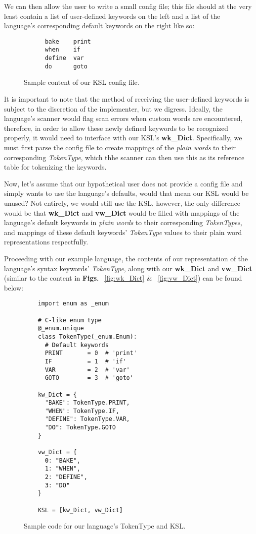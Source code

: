 \documentclass{article}
\begin{document}
We can then allow the user to write a small config file; this file should at the very least contain a list of user-defined keywords on the left and a list of the language's corresponding default keywords on the right like so:

\begin{figure}[ht]
  \begin{verbatim}
      bake    print
      when    if
      define  var
      do      goto
  \end{verbatim}
  \caption{Sample content of our KSL config file.}
  \label{fig:ksl-config-file}
\end{figure}

It is important to note that the method of receiving the user-defined keywords is subject to the discretion of the implementer, but we digress. Ideally, the language's scanner would flag scan errors when custom words are encountered, therefore, in order to allow these newly defined keywords to be recognized properly, it would need to interface with our KSL's \textbf{wk\_Dict}. Specifically, we must first parse the config file to create mappings of the \textit{plain words} 
to their corresponding \textit{TokenType}, which thhe scanner can then use this as its reference table for tokenizing the keywords.

Now, let's assume that our hypothetical user does not provide a config file and simply wants to use the language's defaults, would that mean our KSL would be unused? Not entirely, we would still use the KSL, however, the only difference would be that \textbf{wk\_Dict} and \textbf{vw\_Dict} would be filled with mappings of the language's default keywords in \textit{plain words} to their corresponding \textit{TokenTypes}, and mappings of these default keywords' \textit{TokenType} values to their plain word representations respectfully.

Proceeding with our example language, the contents of our representation of the language's syntax keywords' \textit{TokenType}, along with our \textbf{wk\_Dict} and \textbf{vw\_Dict} (similar to the content in \textbf{Figs}. ~\ref{fig:wk_Dict} \& ~\ref{fig:vw_Dict}) can be found below:

\begin{figure}[ht]
  \begin{verbatim}
    import enum as _enum 

    # C-like enum type
    @_enum.unique
    class TokenType(_enum.Enum):
      # Default keywords
      PRINT       = 0  # 'print'
      IF          = 1  # 'if'
      VAR         = 2  # 'var'
      GOTO        = 3  # 'goto'
    
    kw_Dict = {
      "BAKE": TokenType.PRINT,
      "WHEN": TokenType.IF,
      "DEFINE": TokenType.VAR,
      "DO": TokenType.GOTO
    }

    vw_Dict = {
      0: "BAKE",
      1: "WHEN",
      2: "DEFINE",
      3: "DO"
    }

    KSL = [kw_Dict, vw_Dict]
  \end{verbatim}
  \caption{Sample code for our language's TokenType and KSL.}
  \label{fig:sample-code0}
\end{figure}
\end{document}
